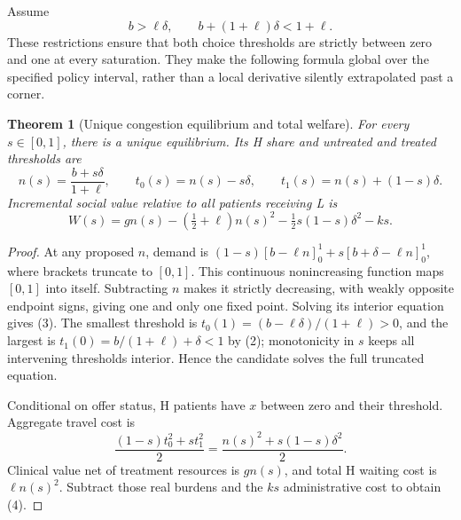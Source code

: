 \documentclass[11pt]{article}
\newtheorem{theorem}{Theorem}
\theoremstyle{definition}
\begin{document}
Assume
\[
 b>\ell\delta,\qquad b+(1+\ell)\delta<1+\ell.
 \tag{2}
\]
These restrictions ensure that both choice thresholds are strictly between zero and one at every saturation. They make the following formula global over the specified policy interval, rather than a local derivative silently extrapolated past a corner.

\begin{theorem}[Unique congestion equilibrium and total welfare]
For every $s\in[0,1]$, there is a unique equilibrium. Its H share and untreated and treated thresholds are
\[
 n(s)=\frac{b+s\delta}{1+\ell},\qquad
 t_0(s)=n(s)-s\delta,\qquad
 t_1(s)=n(s)+(1-s)\delta.
 \tag{3}
\]
Incremental social value relative to all patients receiving L is
\[
 W(s)=g n(s)-\left(\tfrac12+\ell\right)n(s)^2
            -\tfrac12s(1-s)\delta^2-ks.
 \tag{4}
\]
\end{theorem}
\begin{proof}
At any proposed $n$, demand is $(1-s)[b-\ell n]_0^1+s[b+\delta-\ell n]_0^1$, where brackets truncate to $[0,1]$. This continuous nonincreasing function maps $[0,1]$ into itself. Subtracting $n$ makes it strictly decreasing, with weakly opposite endpoint signs, giving one and only one fixed point. Solving its interior equation gives (3). The smallest threshold is $t_0(1)=(b-\ell\delta)/(1+\ell)>0$, and the largest is $t_1(0)=b/(1+\ell)+\delta<1$ by (2); monotonicity in $s$ keeps all intervening thresholds interior. Hence the candidate solves the full truncated equation.

Conditional on offer status, H patients have $x$ between zero and their threshold. Aggregate travel cost is
\[
 \frac{(1-s)t_0^2+s t_1^2}{2}
       =\frac{n(s)^2+s(1-s)\delta^2}{2}.
\]
Clinical value net of treatment resources is $gn(s)$, and total H waiting cost is $\ell n(s)^2$. Subtract those real burdens and the $ks$ administrative cost to obtain (4).
\end{proof}
\end{document}
